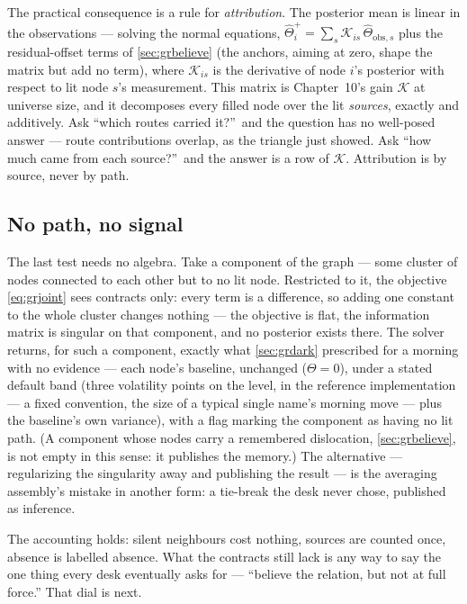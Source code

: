 The practical consequence is a rule for \emph{attribution}.  The
posterior mean is linear in the observations --- solving the normal
equations, $\hat\Theta^{+}_i=\sum_s
\mathcal{K}_{is}\,\hat\Theta_{\mathrm{obs},s}$ plus the
residual-offset terms of \cref{sec:grbelieve} (the anchors, aiming at
zero, shape the matrix but add no term), where $\mathcal{K}_{is}$ is
the derivative of node $i$'s posterior with respect to lit node $s$'s
measurement.  This matrix is Chapter~10's gain
$\mathcal{K}$ at universe size, and it decomposes every filled
node over the lit \emph{sources}, exactly and additively.  Ask
``which routes carried it?''\ and the question has no well-posed
answer --- route contributions overlap, as the triangle just showed.
Ask ``how much came from each source?''\ and the answer is a row of
$\mathcal{K}$.  Attribution is by source, never by path.

\subsection{No path, no signal}

The last test needs no algebra.  Take a component of the graph ---
some cluster of nodes connected to each other but to no lit node.
Restricted to it, the objective \cref{eq:grjoint} sees contracts only:
every term is a difference, so adding one constant to the whole
cluster changes nothing --- the objective is flat, the information
matrix is singular on that component, and no posterior exists there.
The solver returns, for such a component, exactly what
\cref{sec:grdark} prescribed for a morning with no evidence ---
each node's baseline, unchanged ($\Theta=0$), under a stated default
band (three volatility points on the level, in the reference
implementation --- a fixed convention, the size of a typical single
name's morning move --- plus the baseline's own variance), with a
flag marking the component as having no lit path.  (A component
whose nodes carry a remembered dislocation, \cref{sec:grbelieve},
is not empty in this sense: it publishes the memory.)  The alternative --- regularizing the singularity away and
publishing the result --- is the averaging assembly's mistake in
another form: a tie-break the desk never chose, published as
inference.

The accounting holds: silent neighbours cost nothing, sources are
counted once, absence is labelled absence.  What the contracts still
lack is any way to say the one thing every desk eventually asks for
--- ``believe the relation, but not at full force.''  That dial is
next.
